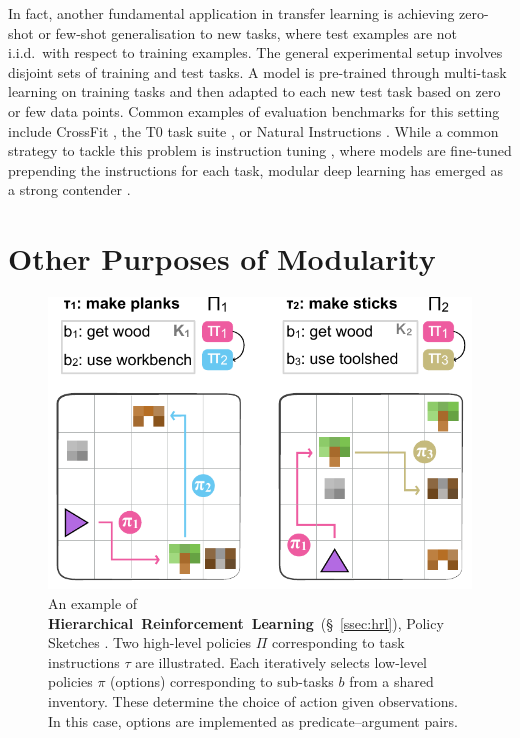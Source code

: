 \documentclass[10pt]{article} %
\begin{document}
In fact, another fundamental application in transfer learning is achieving zero-shot or few-shot generalisation to new tasks, where test examples are not i.i.d.\ with respect to training examples. The general experimental setup involves disjoint sets of training and test tasks. A model is pre-trained through multi-task learning on training tasks and then adapted to each new test task based on zero or few data points. Common examples of evaluation benchmarks for this setting include CrossFit \citep{ye-etal-2021-crossfit}, the T0 task suite \citep{sanh2022multitask}, or Natural Instructions \citep{mishra-etal-2022-cross}. While a common strategy to tackle this problem is instruction tuning \citep{sanh2022multitask,wei2022finetuned}, where models are fine-tuned prepending the instructions for each task, modular deep learning has emerged as a strong contender \citep{alet2018modular,kudugunta2021beyond,ponti2022combining}.

 

\section{Other Purposes of Modularity}
\label{sec:purposes}

\begin{figure}[t]
    \centering
        \vspace{3em}
        \includegraphics[width=.5\linewidth]{img/schema_hrl}
        \caption{An example of \textbf{Hierarchical~Reinforcement~Learning}~(\S~\ref{ssec:hrl}), Policy Sketches \citep{andreas2017modular}. Two high-level policies $\Pi$ corresponding to task instructions $\tau$ are illustrated. Each iteratively selects low-level policies $\pi$ (options) corresponding to sub-tasks $b$ from a shared inventory. These determine the choice of action given observations. In this case, options are implemented as predicate--argument pairs.}
        \label{fig:purpose_modularity:hrl}
    \end{figure}
    
\end{document}
